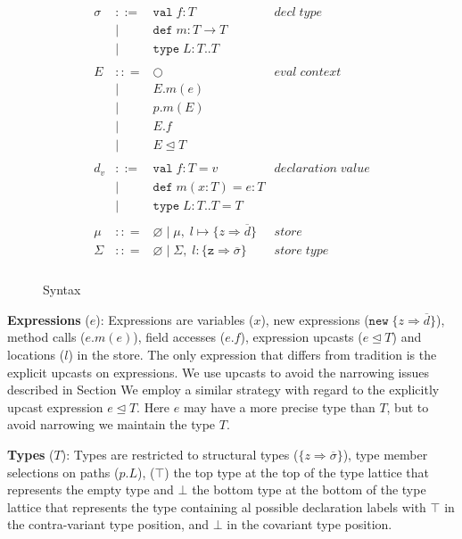 \documentclass[a4paper,UKenglish]{lipics}
\begin{document}
\begin{figure}[h]
\[\begin{array}{lll}
\begin{array}{lllr}
\sigma & ::= & \texttt{val} \; f:T & decl \; type\\
       & |   & \texttt{def} \; m:T \rightarrow T \\
		 & |   & \texttt{type} \; L : T .. T &\\
&&\\
E & :: = & \bigcirc & eval \; context\\
       & | & E.m(e)\\
       & | & p.m(E)\\
       & | & E.f\\
       & | & E \unlhd T\\
&&\\
d_v & ::= & \texttt{val} \; f : T = v & declaration \; value \\
  & |   & \texttt{def} \; m(x:T) = e : T &\\
  & |   & \texttt{type} \; L : T .. T = T &\\
&&\\
\mu & :: = & \varnothing \; | \; \mu,\; l \mapsto \{z \Rightarrow \overline{d}\} & store \\
\Sigma & :: = & \varnothing \; | \; \Sigma,\; l : \{\texttt{z} \Rightarrow \overline{\sigma}\} & store \; type \\
\end{array}
\end{array}
\]
\caption{Syntax}
\label{f:syntax}
\end{figure}

\textbf{Expressions} ($e$): Expressions are variables ($x$), new 
expressions ($\texttt{new} \; \{z \Rightarrow \overline{d}\}$), 
method calls ($e.m(e)$), field accesses ($e.f$), expression 
upcasts ($e \unlhd T$) and locations ($l$) in the store. The 
only expression that differs from tradition is the explicit upcasts on expressions. 
We use upcasts to avoid the narrowing issues described in Section
We employ a similar strategy with regard to the explicitly 
upcast expression $e \unlhd T$. Here $e$ may have a more precise 
type than $T$, but to avoid narrowing we maintain the type $T$.

\textbf{Types} ($T$): Types are restricted to structural types 
($\{z \Rightarrow \overline{\sigma}\}$), type member selections on 
paths ($p.L$), ($\top$) the top type at the top of the type lattice 
that represents the empty type and $\bot$ the bottom type at the 
bottom of the type lattice that represents the type containing 
al possible declaration labels with $\top$ in the contra-variant 
type position, and $\bot$ in the covariant type position.
\end{document}
